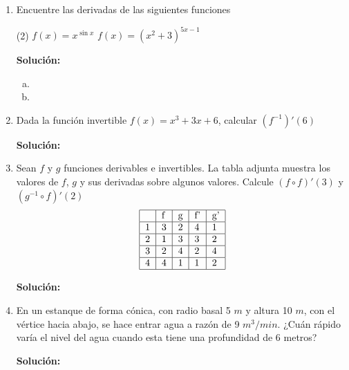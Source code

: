 \documentclass[12pt]{article}
\newenvironment{solucion}
{\begin{mdframed}[backgroundcolor=black!10]
		{\bf Solución:}\\
	}
	{
	\end{mdframed}
}
\newenvironment{preguntas}
{\begin{enumerate}\itemsep12pt
	}
	{
	\end{enumerate}
}
\begin{document}
\begin{preguntas}
\begin{solucion}
Entonces, tomamos
$$xy' + 2yy' = 2x-y$$
Y derivamos implícitamente,
$$y' + xy'' + 2y'^2+2yy'' = 2 - y'$$
Luego, despejamos $y''$,
$$xy''+2yy'' = 2 - y' - y' - 2y'^2$$
$$y''(x+2y) = 2 - 2y' - 2y'^2$$
$$y'' = \dfrac{2 - 2y' - 2y'^2}{x+2y}$$
Ahora, notemos que
$$y'(1,1) = \dfrac{2-1}{1+2} = \dfrac{1}{3}$$
Luego,
$$y''(1,1) = \dfrac{2-2\dfrac{1}{3} - 2\left(\dfrac{1}{3}\right)^2}{1+2} 
= \dfrac{2-\dfrac{2}{3}-\dfrac{2}{9}}{3}
= \dfrac{2-\dfrac{2}{3}-\dfrac{2}{9}}{3}
= \dfrac{10}{27}
$$
\end{solucion}
\item Encuentre las derivadas de las siguientes funciones
\begin{tasks}(2)
\task $f(x) = x^{\sin x}$
\task $f(x) = (x^2+3)^{5x-1}$
\end{tasks}
\begin{solucion}

\begin{enumerate}[a)]
\item 
\item 
\end{enumerate}
\end{solucion}
\item Dada la función invertible $f(x) = x^3 + 3x + 6$, calcular $(f^{-1})'(6)$
\begin{solucion}

\end{solucion}
\item Sean $f$ y $g$ funciones derivables e invertibles. La tabla adjunta muestra los valores de $f$, $g$ y sus derivadas sobre algunos valores. Calcule $(f \circ f)'(3)$ y $(g^{-1} \circ f)'(2)$
$$
\begin{tabular}{|l|l|l|l|l|}
\hline
  & f & g & f' & g' \\ \hline
1 & 3 & 2 & 4  & 1  \\ \hline
2 & 1 & 3 & 3  & 2  \\ \hline
3 & 2 & 4 & 2  & 4  \\ \hline
4 & 4 & 1 & 1  & 2  \\ \hline
\end{tabular}
$$
\begin{solucion}

\end{solucion}
\item En un estanque de forma cónica, con radio basal 5 $m$ y altura 10 $m$, con el vértice hacia abajo, se hace entrar agua a razón de 9 $m^3/min$. ¿Cuán rápido varía el nivel del agua cuando esta tiene una profundidad de 6 metros?
\begin{solucion}

\end{solucion}
\end{preguntas}
\end{document}
